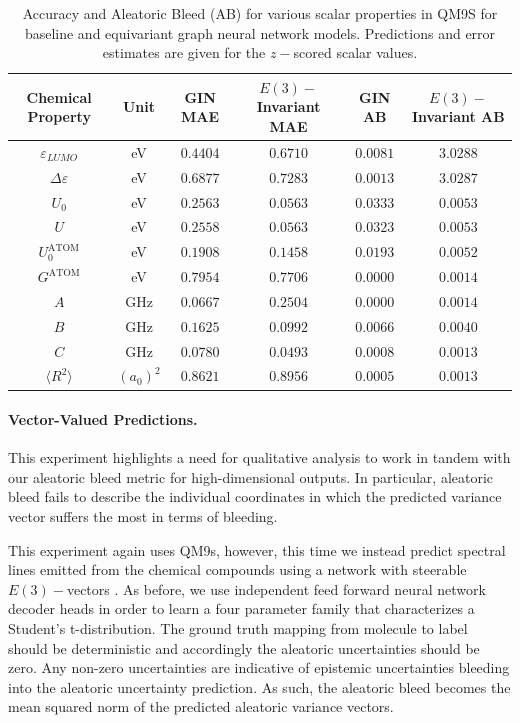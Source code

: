 \documentclass[10pt]{article} %
\theoremstyle{definition}
\begin{document}
\begin{table}[!htb]
    \centering
    \begin{tabular}{c|c|c|c|c|c}
        Chemical Property & Unit & GIN MAE & $E(3)-$Invariant MAE & GIN AB & $E(3)-$Invariant AB\\ \hline
       $\varepsilon_{LUMO}$ & eV  & $0.4404$ & $0.6710$ & $\mathbf{0.0081}$ & $3.0288$ \\
        $\Delta \varepsilon$ & eV & $0.6877$ & $0.7283$ & $\mathbf{0.0013}$ & $3.0287$ \\
       $U_0$ & eV  & $0.2563$ & $0.0563$ & $0.0333$ & $\mathbf{0.0053}$ \\
        $U$ & eV &  $0.2558$ & $0.0563$ & $0.0323$ & $\mathbf{0.0053}$ \\
        $U_0^{\text{ATOM}}$ & eV & $0.1908$ & $0.1458$ & $0.0193$ & $\mathbf{0.0052}$ \\
        $G^{\text{ATOM}}$ & eV & $0.7954$ & $0.7706$ & $\mathbf{0.0000}$ & $0.0014$ \\
        $A$ & GHz & $0.0667$ & $0.2504$ & $\mathbf{0.0000}$ & $0.0014$ \\
        $B$ & GHz & $0.1625$ & $0.0992$ & $0.0066$ & $\mathbf{0.0040}$ \\
        $C$ & GHz & $0.0780$ & $0.0493$ & $\mathbf{0.0008}$ & $0.0013$ \\
        $\langle R^2 \rangle$ & $(a_0)^2$ & $0.8621$ & $0.8956$ & $\mathbf{0.0005}$ & $0.0013$ \\
    \end{tabular}
    \caption{Accuracy and Aleatoric Bleed (AB) for various scalar properties in QM9S for baseline and equivariant graph neural network models. Predictions and error estimates are given for the $z-$scored scalar values.}
    \label{tab:bleed}
\end{table}

\paragraph{Vector-Valued Predictions.} This experiment highlights a need for qualitative analysis to work in tandem with our aleatoric bleed metric for high-dimensional outputs. In particular, aleatoric bleed fails to describe the individual coordinates in which the predicted variance vector suffers the most in terms of bleeding.

This experiment again uses QM9s, however, this time we instead predict spectral lines emitted from the chemical compounds using a network with steerable $E(3)-$vectors \citep{brandstetter2021geometric}. As before, we use independent feed forward neural network decoder heads in order to learn a four parameter family that characterizes a Student's t-distribution. The ground truth mapping from molecule to label should be deterministic and accordingly the aleatoric uncertainties should be zero. Any non-zero uncertainties are indicative of epistemic uncertainties bleeding into the aleatoric uncertainty prediction. As such, the aleatoric bleed becomes the mean squared norm of the predicted aleatoric variance vectors.
\end{document}
